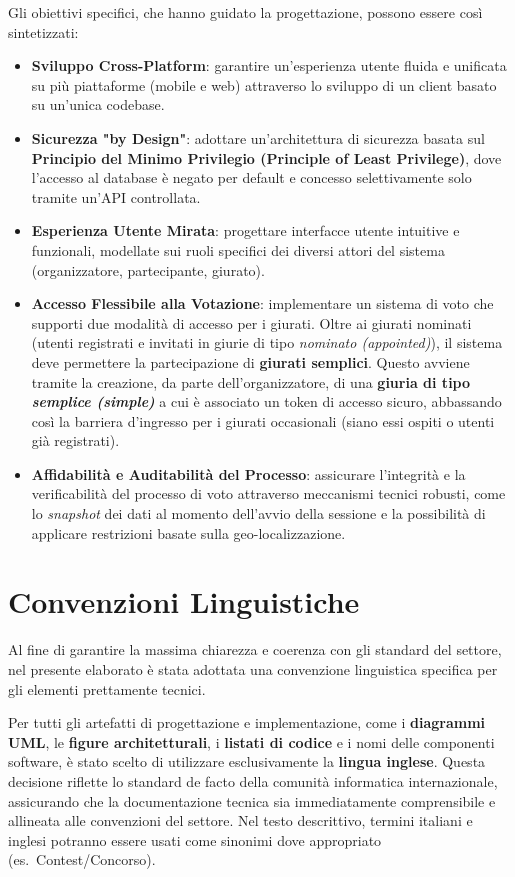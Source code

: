 Gli obiettivi specifici, che hanno guidato la progettazione, possono essere così sintetizzati:
\begin{itemize}
	\item \textbf{Sviluppo Cross-Platform}: garantire un'esperienza utente fluida e unificata su più piattaforme (mobile e web) attraverso lo sviluppo di un client basato su un'unica codebase.
	\item \textbf{Sicurezza "by Design"}: adottare un'architettura di sicurezza basata sul \textbf{Principio del Minimo Privilegio (Principle of Least Privilege)}, dove l'accesso al database è negato per default e concesso selettivamente solo tramite un'API controllata.
	\item \textbf{Esperienza Utente Mirata}: progettare interfacce utente intuitive e funzionali, modellate sui ruoli specifici dei diversi attori del sistema (organizzatore, partecipante, giurato).
	\item \textbf{Accesso Flessibile alla Votazione}: implementare un sistema di voto che supporti due modalità di accesso per i giurati.
	Oltre ai giurati nominati (utenti registrati e invitati in giurie di tipo \emph{nominato (appointed)}), il sistema deve permettere la partecipazione di \textbf{giurati semplici}.
	Questo avviene tramite la creazione, da parte dell'organizzatore, di una \textbf{giuria di tipo \emph{semplice (simple)}} a cui è associato un token di accesso sicuro, abbassando così la barriera d'ingresso per i giurati occasionali (siano essi ospiti o utenti già registrati).
	\item \textbf{Affidabilità e Auditabilità del Processo}: assicurare l'integrità e la verificabilità del processo di voto attraverso meccanismi tecnici robusti, come lo \emph{snapshot} dei dati al momento dell'avvio della sessione e la possibilità di applicare restrizioni basate sulla geo-localizzazione.
\end{itemize}

\section{Convenzioni Linguistiche}\label{sec:convenzioni-linguistiche}
Al fine di garantire la massima chiarezza e coerenza con gli standard del settore, nel presente elaborato è stata adottata una convenzione linguistica specifica per gli elementi prettamente tecnici.

Per tutti gli artefatti di progettazione e implementazione, come i \textbf{diagrammi UML}, le \textbf{figure architetturali}, i \textbf{listati di codice} e i nomi delle componenti software, è stato scelto di utilizzare esclusivamente la \textbf{lingua inglese}.
Questa decisione riflette lo standard de facto della comunità informatica internazionale, assicurando che la documentazione tecnica sia immediatamente comprensibile e allineata alle convenzioni del settore.
Nel testo descrittivo, termini italiani e inglesi potranno essere usati come sinonimi dove appropriato (es.\ Contest/Concorso).

